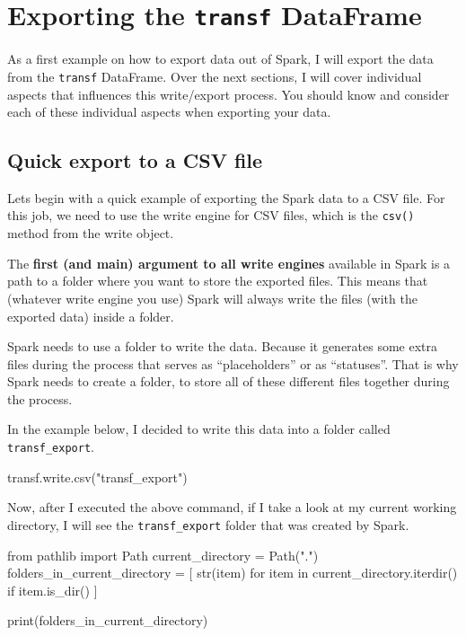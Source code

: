 \documentclass[
  11pt,
  letterpaper,
  DIV=11,
  numbers=noendperiod]{scrreprt}
\newenvironment{Shaded}{\begin{snugshade}}{\end{snugshade}}
\newcommand{\BuiltInTok}[1]{\textcolor[rgb]{0.00,0.23,0.31}{#1}}
\newcommand{\ControlFlowTok}[1]{\textcolor[rgb]{0.00,0.23,0.31}{#1}}
\newcommand{\ImportTok}[1]{\textcolor[rgb]{0.00,0.46,0.62}{#1}}
\newcommand{\KeywordTok}[1]{\textcolor[rgb]{0.00,0.23,0.31}{#1}}
\newcommand{\NormalTok}[1]{\textcolor[rgb]{0.00,0.23,0.31}{#1}}
\newcommand{\OperatorTok}[1]{\textcolor[rgb]{0.37,0.37,0.37}{#1}}
\newcommand{\StringTok}[1]{\textcolor[rgb]{0.13,0.47,0.30}{#1}}
\begin{document}
\hypertarget{sec-write-example}{%
\section{\texorpdfstring{Exporting the \texttt{transf}
DataFrame}{Exporting the transf DataFrame}}\label{sec-write-example}}

As a first example on how to export data out of Spark, I will export the
data from the \texttt{transf} DataFrame. Over the next sections, I will
cover individual aspects that influences this write/export process. You
should know and consider each of these individual aspects when exporting
your data.

\hypertarget{quick-export-to-a-csv-file}{%
\subsection{Quick export to a CSV
file}\label{quick-export-to-a-csv-file}}

Lets begin with a quick example of exporting the Spark data to a CSV
file. For this job, we need to use the write engine for CSV files, which
is the \texttt{csv()} method from the write object.

The \textbf{first (and main) argument to all write engines} available in
Spark is a path to a folder where you want to store the exported files.
This means that (whatever write engine you use) Spark will always write
the files (with the exported data) inside a folder.

Spark needs to use a folder to write the data. Because it generates some
extra files during the process that serves as ``placeholders'' or as
``statuses''. That is why Spark needs to create a folder, to store all
of these different files together during the process.

In the example below, I decided to write this data into a folder called
\texttt{transf\_export}.

\begin{Shaded}
\begin{Highlighting}[]
\NormalTok{transf.write.csv(}\StringTok{"transf\_export"}\NormalTok{)}
\end{Highlighting}
\end{Shaded}

Now, after I executed the above command, if I take a look at my current
working directory, I will see the \texttt{transf\_export} folder that
was created by Spark.

\begin{Shaded}
\begin{Highlighting}[]
\ImportTok{from}\NormalTok{ pathlib }\ImportTok{import}\NormalTok{ Path}
\NormalTok{current\_directory }\OperatorTok{=}\NormalTok{ Path(}\StringTok{"."}\NormalTok{)}
\NormalTok{folders\_in\_current\_directory }\OperatorTok{=}\NormalTok{ [}
    \BuiltInTok{str}\NormalTok{(item)}
    \ControlFlowTok{for}\NormalTok{ item }\KeywordTok{in}\NormalTok{ current\_directory.iterdir()}
    \ControlFlowTok{if}\NormalTok{ item.is\_dir()}
\NormalTok{]}

\BuiltInTok{print}\NormalTok{(folders\_in\_current\_directory)}
\end{Highlighting}
\end{Shaded}
\end{document}
